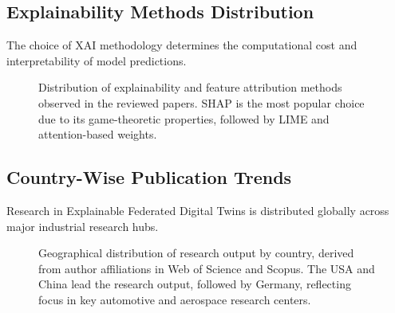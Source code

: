 \documentclass[journal,10pt,compsoc]{IEEEtran}
\begin{document}
\subsection{Explainability Methods Distribution}

The choice of XAI methodology determines the computational cost and interpretability of model predictions.

\begin{figure}[t]
\centering
{}
\caption{Distribution of explainability and feature attribution methods observed in the reviewed papers. SHAP is the most popular choice due to its game-theoretic properties, followed by LIME and attention-based weights.}
\label{fig:trend_xai}
\end{figure}

\subsection{Country-Wise Publication Trends}

Research in Explainable Federated Digital Twins is distributed globally across major industrial research hubs.

\begin{figure}[t]
\centering
{}
\caption{Geographical distribution of research output by country, derived from author affiliations in Web of Science and Scopus. The USA and China lead the research output, followed by Germany, reflecting focus in key automotive and aerospace research centers.}
\label{fig:trend_country}
\end{figure}
\end{document}

